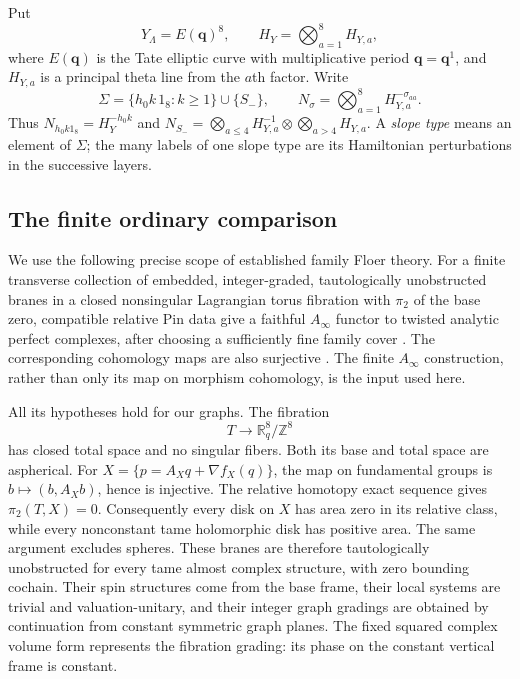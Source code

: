 \documentclass[11pt]{article}
\theoremstyle{definition}
\theoremstyle{remark}
\numberwithin{equation}{section}
\begin{document}
Put
\[
 Y_\Lambda=E(\mathbf q)^8,\qquad
 H_Y=\bigotimes_{a=1}^8 H_{Y,a},
\]
where $E(\mathbf q)$ is the Tate elliptic curve with multiplicative period
$\mathbf q=\mathbf q^1$, and $H_{Y,a}$ is a principal theta line from the $a$th
factor.  Write
\[
 \Sigma=\{h_0k\,1_8:k\geq1\}\cup\{S_-\},\qquad
 N_\sigma=\bigotimes_{a=1}^8H_{Y,a}^{-\sigma_{aa}}.
\]
Thus $N_{h_0k1_8}=H_Y^{-h_0k}$ and
$N_{S_-}=\bigotimes_{a\leq4}H_{Y,a}^{-1}
\otimes\bigotimes_{a>4}H_{Y,a}$.  A \emph{slope type} means an element
of $\Sigma$; the many labels of one slope type are its Hamiltonian
perturbations in the successive layers.

\subsection{The finite ordinary comparison}

We use the following precise scope of established family Floer theory.
For a finite transverse collection of embedded, integer-graded,
tautologically unobstructed branes in a closed nonsingular Lagrangian
torus fibration with $\pi_2$ of the base zero, compatible relative
Pin data give a faithful $A_\infty$ functor to twisted analytic perfect
complexes, after choosing a sufficiently fine family cover
\cite[Theorem~2.10, \S2.4.1, and Appendix~A]{abouzaid-faithful}.
The corresponding cohomology maps are also surjective
\cite[Theorem~1.1 and Corollary~1.2]{abouzaid-hms}.  The finite
$A_\infty$ construction, rather than only its map on morphism cohomology,
is the input used here.

All its hypotheses hold for our graphs.  The fibration
\[
 T\longrightarrow \mathbb R^8_q/\mathbb Z^8
\]
has closed total space and no singular fibers.  Both its base and total
space are aspherical.  For
$X=\{p=A_Xq+\nabla f_X(q)\}$, the map on fundamental groups is
$b\mapsto(b,A_Xb)$, hence is injective.  The relative homotopy exact
sequence gives $\pi_2(T,X)=0$.  Consequently every disk on $X$ has
area zero in its relative class, while every nonconstant tame
holomorphic disk has positive area.  The same argument excludes
spheres.  These branes are therefore tautologically unobstructed for
every tame almost complex structure, with zero bounding cochain.
Their spin structures come from the base frame, their local systems
are trivial and valuation-unitary, and their integer graph gradings
are obtained by continuation from constant symmetric graph planes.
The fixed squared complex volume form represents the fibration
grading: its phase on the constant vertical frame is constant.
\end{document}
